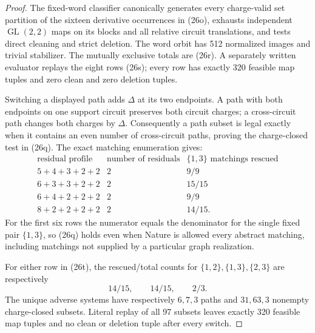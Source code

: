 \documentclass[11pt]{article}
\theoremstyle{definition}
\theoremstyle{remark}
\begin{document}
\begin{proof}
The fixed-word classifier canonically generates every charge-valid set
partition of the sixteen derivative occurrences in (26o), exhausts
independent \(\operatorname{GL}(2,2)\) maps on its blocks and all relative
circuit translations, and tests direct cleaning and strict deletion.
The word orbit has 512 normalized images and trivial stabilizer.  The
mutually exclusive totals are (26r).  A separately written evaluator
replays the eight rows (26s); every row has exactly 320 feasible map
tuples and zero clean and zero deletion tuples.

Switching a displayed path adds \(\Delta\) at its two endpoints.  A path
with both endpoints on one support circuit preserves both circuit
charges; a cross-circuit path changes both charges by \(\Delta\).
Consequently a path subset is legal exactly when it contains an even
number of cross-circuit paths, proving the charge-closed test in (26q).
The exact matching enumeration gives:
\[
\begin{array}{c|c|c}
\text{residual profile}&\text{number of residuals}
 &\{1,3\}\text{ matchings rescued}\\ \hline
5+4+3+2+2&2&9/9\\
6+3+3+2+2&2&15/15\\
6+4+2+2+2&2&9/9\\
8+2+2+2+2&2&14/15 .
\end{array}                                                \tag{26u}
\]
For the first six rows the numerator equals the denominator for the
single fixed pair \(\{1,3\}\), so (26q) holds even when Nature is allowed
every abstract matching, including matchings not supplied by a particular
graph realization.

For either row in (26t), the rescued/total counts for
\(\{1,2\},\{1,3\},\{2,3\}\) are respectively
\[
                         14/15,\qquad14/15,\qquad2/3.     \tag{26v}
\]
The unique adverse systems have respectively \(6,7,3\) paths and
\(31,63,3\) nonempty charge-closed subsets.  Literal replay of all 97
subsets leaves exactly 320 feasible map tuples and no clean or deletion
tuple after every switch.


\end{proof}
\end{document}
